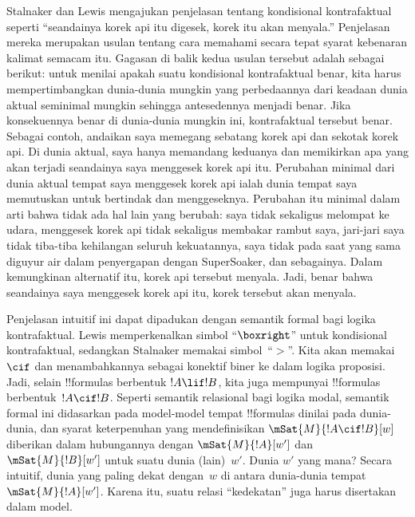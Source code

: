 \documentclass[../../../include/open-logic-section]{subfiles}
\begin{document}


Stalnaker dan Lewis mengajukan penjelasan tentang kondisional kontrafaktual
seperti ``seandainya korek api itu digesek, korek itu akan menyala.''
Penjelasan mereka merupakan usulan tentang cara memahami secara tepat syarat
kebenaran kalimat semacam itu. Gagasan di balik kedua usulan tersebut adalah
sebagai berikut: untuk menilai apakah suatu kondisional kontrafaktual benar,
kita harus mempertimbangkan dunia-dunia mungkin yang perbedaannya dari keadaan
dunia aktual seminimal mungkin sehingga antesedennya menjadi benar. Jika
konsekuennya benar di dunia-dunia mungkin ini, kontrafaktual tersebut benar.
Sebagai contoh, andaikan saya memegang sebatang korek api dan sekotak korek api.
Di dunia aktual, saya hanya memandang keduanya dan memikirkan apa yang akan
terjadi seandainya saya menggesek korek api itu. Perubahan minimal dari dunia
aktual tempat saya menggesek korek api ialah dunia tempat saya memutuskan untuk
bertindak dan menggeseknya. Perubahan itu minimal dalam arti bahwa tidak ada
hal lain yang berubah: saya tidak sekaligus melompat ke udara, menggesek korek
api tidak sekaligus membakar rambut saya, jari-jari saya tidak tiba-tiba
kehilangan seluruh kekuatannya, saya tidak pada saat yang sama diguyur air
dalam penyergapan dengan SuperSoaker, dan sebagainya. Dalam kemungkinan
alternatif itu, korek api tersebut menyala. Jadi, benar bahwa seandainya saya
menggesek korek api itu, korek tersebut akan menyala.

Penjelasan intuitif ini dapat dipadukan dengan semantik formal bagi logika
kontrafaktual. Lewis memperkenalkan simbol ``$\boxright$'' untuk kondisional
kontrafaktual, sedangkan Stalnaker memakai simbol~``$>$''. Kita akan
memakai~$\cif$ dan menambahkannya sebagai konektif biner ke dalam logika
proposisi. Jadi, selain !!{formula}s berbentuk $!A \lif !B$, kita juga
mempunyai !!{formula}s berbentuk~$!A \cif !B$. Seperti semantik relasional
bagi logika modal, semantik formal ini didasarkan pada model-model tempat
!!{formula}s dinilai pada dunia-dunia, dan syarat keterpenuhan yang
mendefinisikan $\mSat{M}{!A \cif !B}[w]$ diberikan dalam hubungannya dengan
$\mSat{M}{!A}[w']$ dan $\mSat{M}{!B}[w']$ untuk suatu dunia (lain)~$w'$.
Dunia $w'$ yang mana? Secara intuitif, dunia yang paling dekat dengan~$w$ di
antara dunia-dunia tempat~$\mSat{M}{!A}[w']$. Karena itu, suatu relasi
``kedekatan'' juga harus disertakan dalam model.
\end{document}
